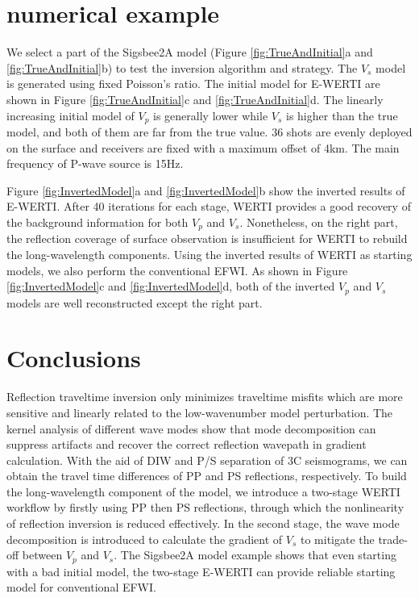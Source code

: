 \section{numerical example}
We select a part of the Sigsbee2A model (Figure
\ref{fig:TrueAndInitial}a and \ref{fig:TrueAndInitial}b) to test the inversion algorithm and strategy.
The $V_s$ model is generated using fixed Poisson's ratio. 
The initial model for E-WERTI are shown in 
Figure \ref{fig:TrueAndInitial}c and \ref{fig:TrueAndInitial}d.
The linearly increasing initial model of $V_p$ is generally lower while 
$V_s$ is higher than the true model, and both of
them are far from the true value. 36 shots are evenly deployed on the surface and receivers are
fixed with a maximum offset of 4km. 
The main frequency of P-wave source is 15Hz.

Figure \ref{fig:InvertedModel}a and \ref{fig:InvertedModel}b show the inverted results of E-WERTI.
After
40 iterations for each stage, WERTI provides a good recovery of the background
information for both $V_p$ and $V_s$. 
Nonetheless, on the right part, the reflection coverage of surface observation is insufficient for
WERTI to rebuild the long-wavelength components. 
Using the inverted results of WERTI as starting
models, we also perform the conventional EFWI. As shown in Figure \ref{fig:InvertedModel}c and
\ref{fig:InvertedModel}d, both of the inverted $V_p$ and $V_s$ models are well
reconstructed except the right part.
\section{Conclusions}
Reflection traveltime inversion only minimizes traveltime misfits which are more sensitive
and linearly related to the low-wavenumber model perturbation. 
The kernel analysis of different wave modes show that mode decomposition can 
suppress artifacts and recover the correct reflection wavepath in gradient calculation.
With the aid of DIW and
P/S separation of 3C seismograms, we can obtain the travel time differences of PP and PS
reflections, respectively. 
To build the long-wavelength component of the model, we introduce a two-stage WERTI
workflow by firstly using PP then PS reflections, through which the nonlinearity of reflection
inversion is reduced effectively. 
In the second stage, the wave mode
decomposition is introduced to calculate the gradient of $V_s$ to mitigate the trade-off between
$V_p$ and $V_s$.
The Sigsbee2A model example shows that even starting with a bad initial model, the
two-stage E-WERTI can provide reliable starting model for conventional EFWI. 

